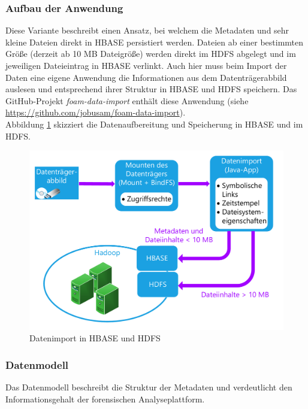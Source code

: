 \subsubsection{Aufbau der Anwendung} 
 
Diese Variante beschreibt einen Ansatz, bei welchem die Metadaten und sehr kleine Dateien direkt in HBASE persistiert werden. Dateien ab einer bestimmten Größe (derzeit ab 10 MB Dateigröße) werden direkt im HDFS abgelegt und im jeweiligen Dateieintrag in HBASE verlinkt. Auch hier muss beim Import der Daten eine eigene Anwendung die Informationen aus dem Datenträgerabbild auslesen und entsprechend ihrer Struktur in HBASE und HDFS speichern. Das GitHub-Projekt \textit{foam-data-import} enthält diese Anwendung (siehe \url{https://github.com/jobusam/foam-data-import}).\\
Abbildung \ref{fig:data_import} skizziert die Datenaufbereitung und Speicherung in HBASE und im HDFS.\\
\begin{figure}[ht]
  \centering
  \includegraphics[width=\textwidth]{./resource/storage_hdfs_and_hbase.pdf}
  \caption{Datenimport in HBASE und HDFS}
  \label{fig:data_import}
\end{figure}

\noindent


\subsubsection{Datenmodell}

Das Datenmodell beschreibt die Struktur der Metadaten und verdeutlicht den Informationsgehalt der forensischen Analyseplattform. 

